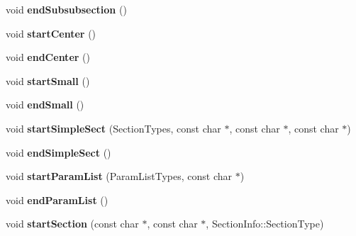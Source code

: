 \begin{DoxyCompactItemize}
\item 
\hypertarget{class_html_generator_af3a0a92b5bad729bb6eeafb07ca54b8f}{void {\bfseries end\-Subsubsection} ()}\label{class_html_generator_af3a0a92b5bad729bb6eeafb07ca54b8f}

\item 
\hypertarget{class_html_generator_abdafeba989f102a3656f6b3341ddc79b}{void {\bfseries start\-Center} ()}\label{class_html_generator_abdafeba989f102a3656f6b3341ddc79b}

\item 
\hypertarget{class_html_generator_a3e879450d54b627a5d86065b831ca0ac}{void {\bfseries end\-Center} ()}\label{class_html_generator_a3e879450d54b627a5d86065b831ca0ac}

\item 
\hypertarget{class_html_generator_a3a61d98acef498d905bd2c3f070a02a1}{void {\bfseries start\-Small} ()}\label{class_html_generator_a3a61d98acef498d905bd2c3f070a02a1}

\item 
\hypertarget{class_html_generator_afd1e7cfc27d1c1aa0638c9c4f94ee469}{void {\bfseries end\-Small} ()}\label{class_html_generator_afd1e7cfc27d1c1aa0638c9c4f94ee469}

\item 
\hypertarget{class_html_generator_af78a3d7bf076c8f5e6bb859460a3437d}{void {\bfseries start\-Simple\-Sect} (Section\-Types, const char $\ast$, const char $\ast$, const char $\ast$)}\label{class_html_generator_af78a3d7bf076c8f5e6bb859460a3437d}

\item 
\hypertarget{class_html_generator_a845408bbcbfed31523c20fd170dd8b45}{void {\bfseries end\-Simple\-Sect} ()}\label{class_html_generator_a845408bbcbfed31523c20fd170dd8b45}

\item 
\hypertarget{class_html_generator_a914331c46e99ec8e8278a658f058bd15}{void {\bfseries start\-Param\-List} (Param\-List\-Types, const char $\ast$)}\label{class_html_generator_a914331c46e99ec8e8278a658f058bd15}

\item 
\hypertarget{class_html_generator_a0cea756e6f65da408378bedffe2b67d1}{void {\bfseries end\-Param\-List} ()}\label{class_html_generator_a0cea756e6f65da408378bedffe2b67d1}

\item 
\hypertarget{class_html_generator_a32fffbabcb45b670e3a6ac0471b99c50}{void {\bfseries start\-Section} (const char $\ast$, const char $\ast$, Section\-Info\-::\-Section\-Type)}\label{class_html_generator_a32fffbabcb45b670e3a6ac0471b99c50}


\end{DoxyCompactItemize}

